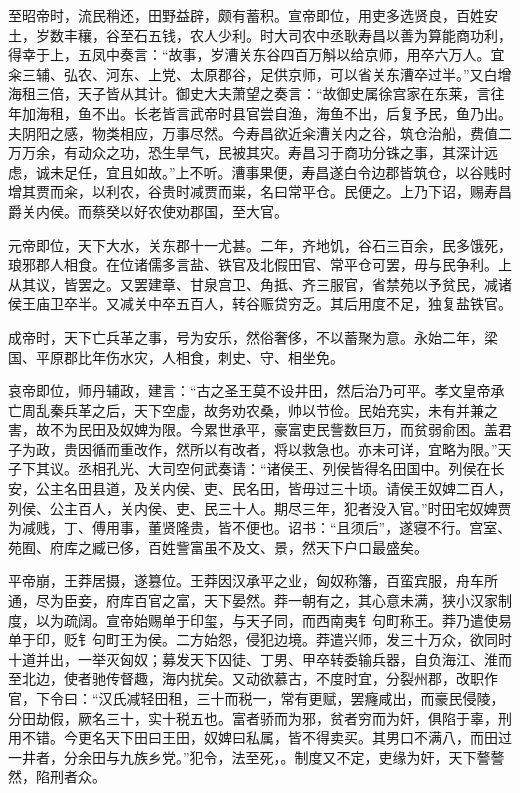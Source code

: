 \documentclass[]{article}
\begin{document}
至昭帝时，流民稍还，田野益辟，颇有蓄积。宣帝即位，用吏多选贤良，百姓安土，岁数丰穰，谷至石五钱，农人少利。时大司农中丞耿寿昌以善为算能商功利，得幸于上，五凤中奏言：``故事，岁漕关东谷四百万斛以给京师，用卒六万人。宜籴三辅、弘农、河东、上党、太原郡谷，足供京师，可以省关东漕卒过半。''又白增海租三倍，天子皆从其计。御史大夫萧望之奏言：``故御史属徐宫家在东莱，言往年加海租，鱼不出。长老皆言武帝时县官尝自渔，海鱼不出，后复予民，鱼乃出。夫阴阳之感，物类相应，万事尽然。今寿昌欲近籴漕关内之谷，筑仓治船，费值二万万余，有动众之功，恐生旱气，民被其灾。寿昌习于商功分铢之事，其深计远虑，诚未足任，宜且如故。''上不听。漕事果便，寿昌遂白令边郡皆筑仓，以谷贱时增其贾而籴，以利农，谷贵时减贾而粜，名曰常平仓。民便之。上乃下诏，赐寿昌爵关内侯。而蔡癸以好农使劝郡国，至大官。

元帝即位，天下大水，关东郡十一尤甚。二年，齐地饥，谷石三百余，民多饿死，琅邪郡人相食。在位诸儒多言盐、铁官及北假田官、常平仓可罢，毋与民争利。上从其议，皆罢之。又罢建章、甘泉宫卫、角抵、齐三服官，省禁苑以予贫民，减诸侯王庙卫卒半。又减关中卒五百人，转谷赈贷穷乏。其后用度不足，独复盐铁官。

成帝时，天下亡兵革之事，号为安乐，然俗奢侈，不以蓄聚为意。永始二年，梁国、平原郡比年伤水灾，人相食，刺史、守、相坐免。

哀帝即位，师丹辅政，建言：``古之圣王莫不设井田，然后治乃可平。孝文皇帝承亡周乱秦兵革之后，天下空虚，故务劝农桑，帅以节俭。民始充实，未有并兼之害，故不为民田及奴婢为限。今累世承平，豪富吏民訾数巨万，而贫弱俞困。盖君子为政，贵因循而重改作，然所以有改者，将以救急也。亦未可详，宜略为限。''天子下其议。丞相孔光、大司空何武奏请：``诸侯王、列侯皆得名田国中。列侯在长安，公主名田县道，及关内侯、吏、民名田，皆毋过三十顷。请侯王奴婢二百人，列侯、公主百人，关内侯、吏、民三十人。期尽三年，犯者没入官。''时田宅奴婢贾为减贱，丁、傅用事，董贤隆贵，皆不便也。诏书：``且须后''，遂寝不行。宫室、苑囿、府库之臧已侈，百姓訾富虽不及文、景，然天下户口最盛矣。

平帝崩，王莽居摄，遂篡位。王莽因汉承平之业，匈奴称籓，百蛮宾服，舟车所通，尽为臣妾，府库百官之富，天下晏然。莽一朝有之，其心意未满，狭小汉家制度，以为疏阔。宣帝始赐单于印玺，与天子同，而西南夷钅句町称王。莽乃遣使易单于印，贬钅句町王为侯。二方始怨，侵犯边境。莽遣兴师，发三十万众，欲同时十道并出，一举灭匈奴；募发天下囚徒、丁男、甲卒转委输兵器，自负海江、淮而至北边，使者驰传督趣，海内扰矣。又动欲慕古，不度时宜，分裂州郡，改职作官，下令曰：``汉氏减轻田租，三十而税一，常有更赋，罢癃咸出，而豪民侵陵，分田劫假，厥名三十，实十税五也。富者骄而为邪，贫者穷而为奸，俱陷于辜，刑用不错。今更名天下田曰王田，奴婢曰私属，皆不得卖买。其男口不满八，而田过一井者，分余田与九族乡党。''犯令，法至死，。制度又不定，吏缘为奸，天下謷謷然，陷刑者众。
\end{document}
